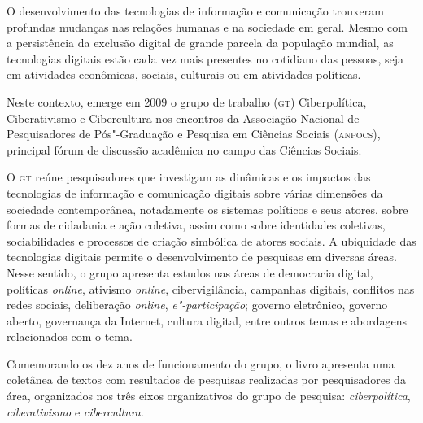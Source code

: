 

\begin{flushright}
\end{flushright}


\noindent{}O desenvolvimento das tecnologias de informação e comunicação trouxeram
profundas mudanças nas relações humanas e na sociedade em geral. Mesmo
com a persistência da exclusão digital de grande parcela da população
mundial, as tecnologias digitais estão cada vez mais presentes no
cotidiano das pessoas, seja em atividades econômicas, sociais, culturais
ou em atividades políticas.


Neste contexto, emerge em 2009 o grupo de trabalho (\textsc{gt}) Ciberpolítica,
Ciberativismo e Cibercultura nos encontros da Associação Nacional de
Pesquisadores de Pós"-Graduação e Pesquisa em Ciências Sociais (\textsc{anpocs}),
principal fórum de discussão acadêmica no campo das Ciências Sociais.

O \textsc{gt} reúne pesquisadores
que investigam as dinâmicas e os impactos das tecnologias de informação
e comunicação digitais sobre várias dimensões da sociedade
contemporânea, notadamente os sistemas políticos e seus atores, sobre
formas de cidadania e ação coletiva, assim como sobre identidades
coletivas, sociabilidades e processos de criação simbólica de atores
sociais. A ubiquidade das tecnologias digitais permite o desenvolvimento
de pesquisas em diversas áreas. Nesse sentido, o grupo apresenta estudos
nas áreas de democracia digital, políticas \emph{online}, ativismo \emph{online},
cibervigilância, campanhas digitais, conflitos nas redes sociais,
deliberação \emph{online}, \textit{e"-participação}; governo eletrônico, governo aberto,
governança da Internet, cultura digital, entre outros temas e abordagens
relacionados com o tema.

Comemorando os dez anos de funcionamento do grupo, o livro apresenta uma
coletânea de textos com resultados de pesquisas realizadas por
pesquisadores da área, organizados nos três eixos organizativos do grupo
de pesquisa: \textit{ciberpolítica}, \textit{ciberativismo} e \textit{cibercultura}.

